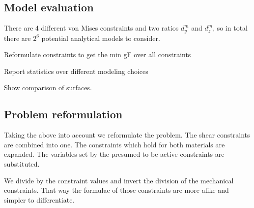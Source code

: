 



\subsection{Model evaluation}
There are 4 different von Mises constraints and two ratios $d_y^m$ and $d_z^m$, so in total there are $2^6$ potential analytical models to consider.



Reformulate constraints to get the min gF over all constraints

Report statistics over different modeling choices

Show comparison of surfaces.



\subsection{Problem reformulation}
Taking the above into account we reformulate the problem.
The shear constraints are combined into one.
The constraints which hold for both materials are expanded.
The variables set by the presumed to be active constraints are substituted.

We divide by the constraint values and invert the division of the mechanical constraints.
That way the formulae of those constraints are more alike and simpler to differentiate.

